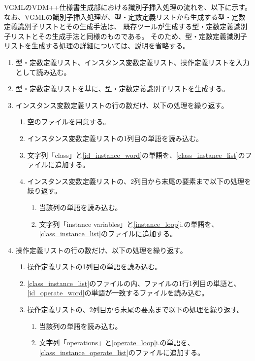 VGMLのVDM++仕様書生成部における識別子挿入処理の流れを、以下に示す。
なお、VGMLの識別子挿入処理が、型・定数定義リストから生成する型・定数定義識別子リストとその生成手法は、
既存ツールが生成する型・定数定義識別子リストとその生成手法と同様のものである。
そのため、型・定数定義識別子リストを生成する処理の詳細については、説明を省略する。

\begin{enumerate}
    \item 型・定数定義リスト、インスタンス変数定義リスト、操作定義リストを入力として読み込む。
    \item 型・定数定義リストを基に、型・定数定義識別子リストを生成する。
    \item インスタンス変数定義リストの行の数だけ、以下の処理を繰り返す。
        \begin{enumerate}
            \item 空のファイルを用意する。
            \label{class_instance_list}
            \item インスタンス変数定義リストの1列目の単語を読み込む。
            \label{id_instance_word}
            \item 文字列「class」と\ref{id_instance_word}の単語を、\ref{class_instance_list}のファイルに追加する。
            \item インスタンス変数定義リストの、2列目から末尾の要素まで以下の処理を繰り返す。
            \label{instance_loop}
                \begin{enumerate}
                    \item 当該列の単語を読み込む。
                    \label{instance_word}
                    \item 文字列「instance variables」と\ref{instance_loop}i.の単語を、\ref{class_instance_list}のファイルに追加する。
                \end{enumerate}
        \end{enumerate}
    \item 操作定義リストの行の数だけ、以下の処理を繰り返す。
        \begin{enumerate}
            \item 操作定義リストの1列目の単語を読み込む。
            \label{id_operate_word}
            \item \ref{class_instance_list}のファイルの内、ファイルの1行1列目の単語と、\ref{id_operate_word}の単語が一致するファイルを読み込む。
            \label{class_instance_operate_list}
            \item 操作定義リストの、2列目から末尾の要素まで以下の処理を繰り返す。
            \label{operate_loop}
                \begin{enumerate}
                    \item 当該列の単語を読み込む。
                    \label{operate_word}
                    \item 文字列「operations」と\ref{operate_loop}i.の単語を、\ref{class_instance_operate_list}のファイルに追加する。
                \end{enumerate}
        \end{enumerate}
\end{enumerate}

